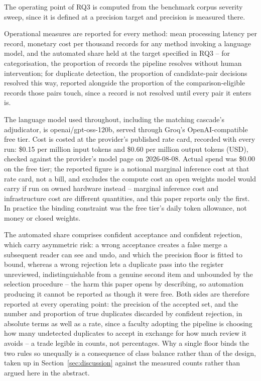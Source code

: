 \documentclass[conference]{IEEEtran}
\begin{document}
The operating point of RQ3 is computed from the benchmark corpus
severity sweep, since it is defined at a precision target and precision
is measured there.

Operational measures are reported for every method: mean processing
latency per record, monetary cost per thousand records for any method
invoking a language model, and the automated share held at the target
specified in RQ3 -- for categorisation, the proportion of records the
pipeline resolves without human intervention; for duplicate detection,
the proportion of candidate-pair decisions resolved this way, reported
alongside the proportion of the comparison-eligible records those
pairs touch, since a record is not resolved until every pair it enters
is.

The language model used throughout, including the matching cascade's
adjudicator, is openai/gpt-oss-120b, served through Groq's
OpenAI-compatible free tier. Cost is costed at the provider's
published rate card, recorded with every run: \$0.15 per million
input tokens and \$0.60 per million output tokens (USD), checked
against the provider's model page on 2026-08-08. Actual spend was
\$0.00 on the free tier; the reported figure is a notional marginal
inference cost at that rate card, not a bill, and excludes the compute
cost an open weights model would carry if run on owned hardware
instead -- marginal inference cost and infrastructure cost are
different quantities, and this paper reports only the first. In
practice the binding constraint was the free tier's daily token
allowance, not money or closed weights.

The automated share comprises confident acceptance and confident
rejection, which carry asymmetric risk: a wrong acceptance creates a
false merge a subsequent reader can see and undo, and which the
precision floor is fitted to bound, whereas a wrong rejection lets a
duplicate pass into the register unreviewed, indistinguishable from a
genuine second item and unbounded by the selection procedure -- the
harm this paper opens by describing, so automation producing it cannot
be reported as though it were free. Both sides are therefore reported
at every operating point: the precision of the accepted set, and the
number and proportion of true duplicates discarded by confident
rejection, in absolute terms as well as a rate, since a faculty
adopting the pipeline is choosing how many undetected duplicates to
accept in exchange for how much review it avoids -- a trade legible in
counts, not percentages. Why a single floor binds the two rules so
unequally is a consequence of class balance rather than of the design,
taken up in Section~\ref{sec:discussion} against the measured counts
rather than argued here in the abstract.
\end{document}
